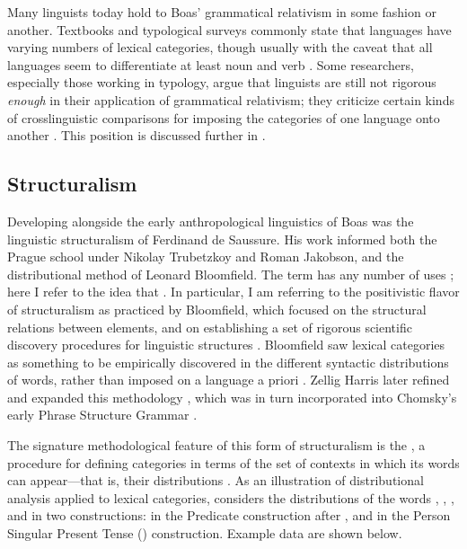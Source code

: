 Many linguists today hold to Boas' grammatical relativism in some fashion or another. Textbooks and typological surveys commonly state that languages have varying numbers of lexical categories, though usually with the caveat that all languages seem to differentiate at least noun and verb \parencite[e.g.][§6.2]{Velupillai2012}. Some researchers, especially those working in typology, argue that linguists are still not rigorous \emph{enough} in their application of grammatical relativism; they criticize certain kinds of crosslinguistic comparisons for imposing the categories of one language onto another \parencites{Croft2001b}{Gil2001}{Haspelmath2010a}{Haspelmath2012}{LaPolla2016}. This position is discussed further in .

\subsection{Structuralism}
\label{sec:2.2.3}

Developing alongside the early anthropological linguistics of Boas was the linguistic structuralism of Ferdinand de Saussure. His work informed both the Prague school under Nikolay Trubetzkoy and Roman Jakobson, and the distributional method of Leonard Bloomfield. The term  has any number of uses \parencite[Ch.~1]{Matthews2001}; here I refer to the idea that . In particular, I am referring to the positivistic flavor of structuralism as practiced by Bloomfield, which focused on the structural relations between elements, and on establishing a set of rigorous scientific discovery procedures for linguistic structures \parencite{Bloomfield1933}. Bloomfield saw lexical categories as something to be empirically discovered in the different syntactic distributions of words, rather than imposed on a language a priori \parencite[33]{Rauh2010}. Zellig Harris later refined and expanded this methodology \parencite{Harris1951}, which was in turn incorporated into Chomsky's early Phrase Structure Grammar \parencite{Chomsky1957}.

The signature methodological feature of this form of structuralism is the , a procedure for defining categories in terms of the set of contexts in which its words can appear—that is, their distributions \parencites[5]{Harris1951}[11]{Croft2001b}. As an illustration of distributional analysis applied to lexical categories, \textcite[11--12]{Croft1991} considers the distributions of the  words , , , and  in two constructions: in the Predicate construction after , and in the  Person Singular Present Tense () construction. Example data are shown below.

